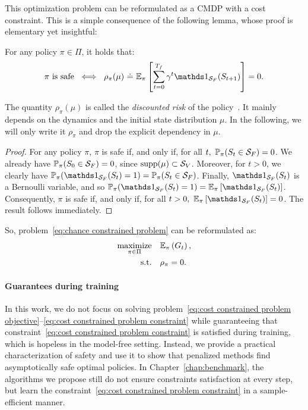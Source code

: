 This optimization problem can be reformulated as a CMDP with a cost constraint. This is a simple consequence of the following lemma, whose proof is elementary yet insightful:
\begin{lemma}
	For any policy $\pi\in\Pi$, it holds that:
	\begin{equation}
		\pi~\text{is safe}~\iff~\rho_\pi(\mu)~\eqdef~\expected_\pi\left[\sum_{t=0}^\Tf\gamma^t\indicator_\SF(S_{t+1})\right] = 0.
	\end{equation}
\end{lemma}
The quantity $\rho_\pi(\mu)$ is called the\emph{ discounted risk} of the policy~\cite{geibel2005risk}. It mainly depends on the dynamics and the initial state distribution $\mu$. In the following, we will only write it $\rho_\pi$ and drop the explicit dependency in $\mu$.
\begin{proof}
	For any policy $\pi$, $\pi$ is safe if, and only if, for all $t,~\mathbb{P}_\pi(S_t\in{\ensuremath{\mathcal{S}}_{F}}) = 0$. We already have $\mathbb{P}_\pi(S_0\in{\ensuremath{\mathcal{S}}_{F}}) = 0$, since $\operatorname{supp}(\mu)\subset{\ensuremath{\mathcal{S}}_{V}}$. Moreover, for $t>0$, we clearly have $\P_\pi(\indicator_\SF(S_t) = 1) = \P_\pi(S_t\in\SF)$. Finally, $\indicator_\SF(S_t)$ is a Bernoulli variable, and so $\P_\pi(\indicator_\SF(S_t) = 1) = \expected_\pi\left[\indicator_\SF(S_t)\right]$. Consequently, $\pi$ is safe if, and only if, for all $t>0,~\expected_\pi\left[\indicator_\SF(S_t)\right] = 0$. The result follows immediately.
\end{proof}
So, problem~\eqref{eq:chance constrained problem} can be reformulated as:
\begin{align}
		\underset{\pi\in\Pi}{\text{maximize}} & \quad\mathbb{E}_\pi\left(G_t\right), \label{eq:cost constrained problem objective}\\
		\text{s.t.} & \quad \rho_\pi = 0. \label{eq:cost constrained problem constraint}
\end{align}
\paragraph{Guarantees during training} In this work, we do not focus on solving problem~\eqref{eq:cost constrained problem objective}--\eqref{eq:cost constrained problem constraint} while guaranteeing that constraint~\eqref{eq:cost constrained problem constraint} is satisfied during training, which is hopeless in the model-free setting. Instead, we provide a practical characterization of safety and use it to show that penalized methods find asymptotically safe optimal policies. In Chapter~\ref{chap:benchmark}, the algorithms we propose still do not ensure constraints satisfaction at every step, but learn the constraint~\eqref{eq:cost constrained problem constraint} in a sample-efficient manner.


